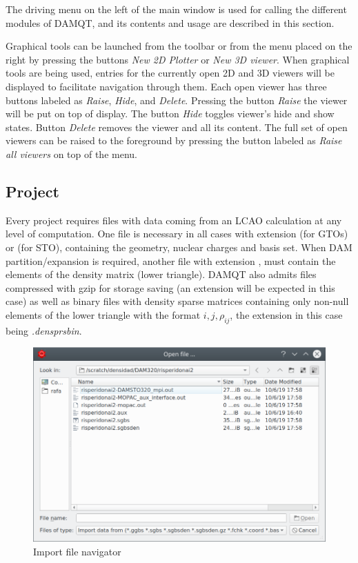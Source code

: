 \documentclass[10pt]{article}
\begin{document}
\vspace*{3mm}

The driving menu on the left of the main window is used for calling the different
modules of DAMQT, and its contents and usage are described in this section.

Graphical tools can be launched from the toolbar or from the menu placed on the right by pressing the 
buttons {\it New 2D Plotter} or {\it New 3D viewer}. When
graphical tools are being used, entries for the currently open 2D and 3D viewers
will be displayed to facilitate navigation through them. Each open viewer has three buttons
labeled as {\it Raise}, {\it Hide}, and {\it Delete}. Pressing the button {\it Raise} the viewer will
be put on top of display. The button {\it Hide} toggles viewer's hide and show states. 
Button {\it Delete} removes the viewer and all its content. The full set of open viewers can be raised
to the foreground by pressing the button labeled as {\it Raise all viewers} on top of the menu.

\subsection{Project \label{sec:2.1}}


Every project requires files with data
coming from an LCAO calculation at any level of computation. 
One file is necessary in all cases with
extension \ggbs{} (for GTOs) or
\sgbs{} (for STO), containing the geometry, nuclear
charges and basis set.
When DAM partition/expansion is required, another file with extension
\den{}, must contain the elements of the density
matrix (lower triangle). DAMQT also admits \den{} files compressed with 
gzip for storage saving (an extension \dengz{} will be expected
in this case) as well as binary files with density sparse matrices containing only non-null elements of the lower triangle with the format $i,j,\rho_{ij}$, the extension in this case being {\it .densprsbin}.

\begin{figure}[H]
\begin{center}
\includegraphics[width=.5\linewidth]{damqt_fig_2_1_1.png}
\end{center}
\caption{Import file navigator \label{fig:2_1_1}}
\end{figure}
\end{document}
